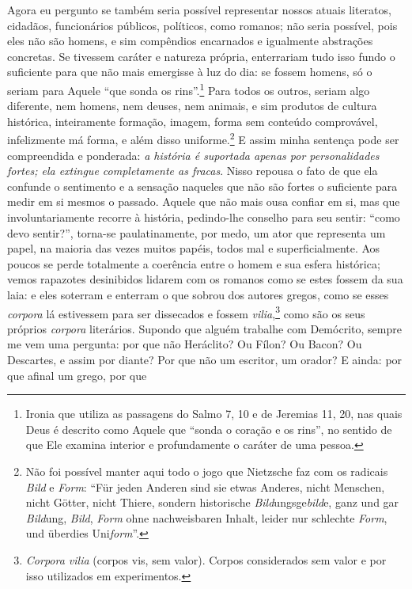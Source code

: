 Agora eu pergunto se
também seria possível representar nossos atuais literatos, cidadãos,
funcionários públicos, políticos, como romanos; não seria possível, pois
eles não são homens, e sim compêndios encarnados e igualmente abstrações
concretas. Se tivessem caráter e natureza própria, enterrariam tudo isso
fundo o suficiente para que não mais emergisse à luz do dia: se fossem
homens, só o seriam para Aquele ``que sonda os rins''.\footnote{Ironia
  que utiliza as passagens do Salmo 7, 10 e de Jeremias 11, 20, nas quais Deus
  é descrito como Aquele que ``sonda o coração e os rins'', no sentido
  de que Ele examina interior e profundamente o caráter de uma
  pessoa.} Para todos os outros, seriam algo diferente, nem homens, nem
deuses, nem animais, e sim produtos de cultura histórica, inteiramente
formação, imagem, forma sem conteúdo comprovável, infelizmente má forma,
e além disso uniforme.\footnote{Não foi possível manter aqui todo o jogo
  que Nietz\-sche faz com os radicais \emph{Bild} e \emph{Form}: ``Für
  jeden Anderen sind sie etwas Anderes, nicht Menschen, nicht Götter,
  nicht Thiere, sondern historische \emph{Bild}ungsge\emph{bild}e, ganz
  und gar \emph{Bild}ung, \emph{Bild}, \emph{Form} ohne nachweisbaren
  Inhalt, leider nur schlechte \emph{Form}, und überdies
  Uni\emph{form}''.} E assim minha sentença pode ser compreendida e
ponderada: \emph{a história é suportada apenas por personalidades
fortes; ela extingue completamente as fracas}. Nisso repousa o fato de
que ela confunde o sentimento e a sensação naqueles que não são fortes o
suficiente para medir em si mesmos o passado. Aquele que não mais ousa
confiar em si, mas que involuntariamente recorre à história, pedindo-lhe
conselho para seu sentir: ``como devo sentir?'', torna-se
paulatinamente, por medo, um ator que representa um papel, na maioria
das vezes muitos papéis, todos mal e superficialmente. Aos poucos se
perde totalmente a coerência entre o homem e sua esfera histórica; vemos
rapazotes desinibidos lidarem com os romanos como se estes fossem da sua
laia: e eles soterram e enterram o que sobrou dos autores gregos, como
se esses \emph{corpora} lá estivessem para ser dissecados e fossem
\emph{vilia},\footnote{\emph{Corpora vilia} (corpos vis, sem valor).
  Corpos considerados sem valor e por isso utilizados em experimentos.} 
como são os seus próprios \emph{corpora} literários. Supondo que alguém
trabalhe com Demócrito, sempre me vem uma pergunta: por que não
Heráclito? Ou Fílon? Ou Bacon? Ou Descartes, e assim por diante? Por que
não um escritor, um orador? E ainda: por que afinal um grego, por que
